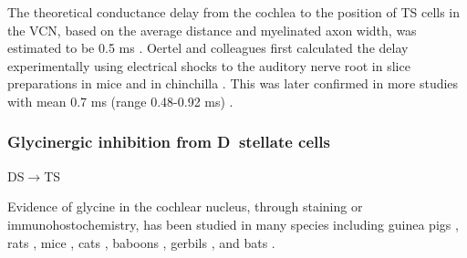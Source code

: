 The theoretical conductance delay from the cochlea to the position of TS cells in the
VCN, based on the average distance and myelinated axon width, was estimated to be 0.5
ms \citep{Brown:1993,BrownLedwith:1990}.  Oertel and colleagues first calculated the
delay experimentally using electrical shocks to the auditory nerve root in slice
preparations in mice \citep[0.7 ms][]{Oertel:1983} and in chinchilla \citep[0.5
ms][]{WickesbergOertel:1993}. This was later confirmed in more studies with mean 0.7
ms (range 0.48-0.92 ms) \citep[mice][]{FerragamoGoldingEtAl:1998a}.



\subsubsection{Glycinergic inhibition from D~stellate cells}

DS\ensuremath{\rightarrow}TS




Evidence of glycine in the cochlear nucleus, through staining or immunohostochemistry, has been studied in many species including
guinea pigs \citep{JuizHelfertEtAl:1996a,HelfertBonneauEtAl:1989,Wenthold:1987,WentholdHuieEtAl:1987,AltschulerBetzEtAl:1986,SaintBensonEtAl:1991,KolstonOsenEtAl:1992,PeyretCampistronEtAl:1987,Alibardi:2003a,MahendrasingamWallamEtAl:2004,MahendrasingamWallamEtAl:2000,BabalianJacommeEtAl:2002},
rats \citep{OsenLopezEtAl:1991,Mugnaini:1985,AokiSembaEtAl:1988,GatesWeedmanEtAl:1996,Alibardi:2003,LimOleskevichEtAl:2003,SrinivasanFriaufEtAl:2004,DoucetRossEtAl:1999},
mice \citep{WickesbergWhitlonEtAl:1991,LimOleskevichEtAl:2003,YangDoievEtAl:2002},
cats \citep{OsenOttersenEtAl:1990,SmithRhode:1989},
baboons \citep{MooreOsenEtAl:1996},
gerbils \citep{GleichVater:1998}, and 
bats \citep{KemmerVater:2001a}.







